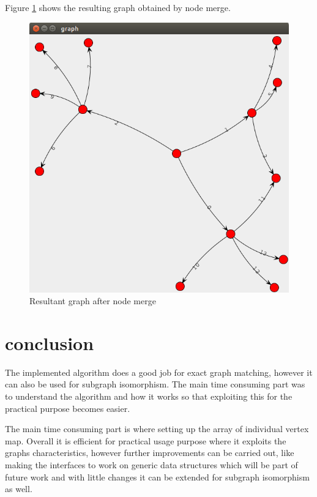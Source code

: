 Figure \ref{result} shows the resulting graph obtained by node merge. 
\begin{figure}
 \centerline{
 \includegraphics[width=1.0\columnwidth]{figures/result.png}
 }
 \caption{Resultant graph after node merge}
 \label{result}
 \end{figure}
 
\section{conclusion}
The implemented algorithm does a good job for exact graph matching, however it can also be used for subgraph isomorphism. The main time consuming part was to understand the algorithm and how it works so that exploiting this for the practical purpose becomes easier.

The main time consuming part is where setting up the array of individual vertex map. Overall it is efficient for practical usage purpose where it exploits the graphs characteristics, however further improvements can be carried out, like making the interfaces to work on generic data structures which will be part of future work and with little changes it can be extended for subgraph isomorphism as well.  
